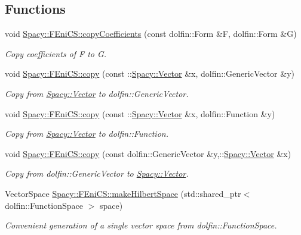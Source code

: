 \subsection*{Functions}
\begin{DoxyCompactItemize}
\item 
void \hyperlink{group__FenicsGroup_gab3d4c7c1e91a50e4e816598258b6edce}{Spacy\-::\-F\-Eni\-C\-S\-::copy\-Coefficients} (const dolfin\-::\-Form \&F, dolfin\-::\-Form \&G)
\begin{DoxyCompactList}\small\item\em Copy coefficients of F to G. \end{DoxyCompactList}\item 
void \hyperlink{group__FenicsGroup_ga7f43f0c660d0646adb031b453c536bb0}{Spacy\-::\-F\-Eni\-C\-S\-::copy} (const \-::\hyperlink{classSpacy_1_1Vector}{Spacy\-::\-Vector} \&x, dolfin\-::\-Generic\-Vector \&y)
\begin{DoxyCompactList}\small\item\em Copy from \hyperlink{classSpacy_1_1Vector}{Spacy\-::\-Vector} to dolfin\-::\-Generic\-Vector. \end{DoxyCompactList}\item 
void \hyperlink{group__FenicsGroup_ga28fb1ebae29e07ec0256bb2331599aa7}{Spacy\-::\-F\-Eni\-C\-S\-::copy} (const \-::\hyperlink{classSpacy_1_1Vector}{Spacy\-::\-Vector} \&x, dolfin\-::\-Function \&y)
\begin{DoxyCompactList}\small\item\em Copy from \hyperlink{classSpacy_1_1Vector}{Spacy\-::\-Vector} to dolfin\-::\-Function. \end{DoxyCompactList}\item 
void \hyperlink{group__FenicsGroup_ga61c5e45dbb789c155fbf86f8ec288f17}{Spacy\-::\-F\-Eni\-C\-S\-::copy} (const dolfin\-::\-Generic\-Vector \&y,\-::\hyperlink{classSpacy_1_1Vector}{Spacy\-::\-Vector} \&x)
\begin{DoxyCompactList}\small\item\em Copy from dolfin\-::\-Generic\-Vector to \hyperlink{classSpacy_1_1Vector}{Spacy\-::\-Vector}. \end{DoxyCompactList}\item 
Vector\-Space \hyperlink{group__FenicsGroup_ga8b67cb3d0188d2398625595b79e2fa6a}{Spacy\-::\-F\-Eni\-C\-S\-::make\-Hilbert\-Space} (std\-::shared\-\_\-ptr$<$ dolfin\-::\-Function\-Space $>$ space)
\begin{DoxyCompactList}\small\item\em Convenient generation of a single vector space from dolfin\-::\-Function\-Space. \end{DoxyCompactList}\item 

\end{DoxyCompactItemize}
